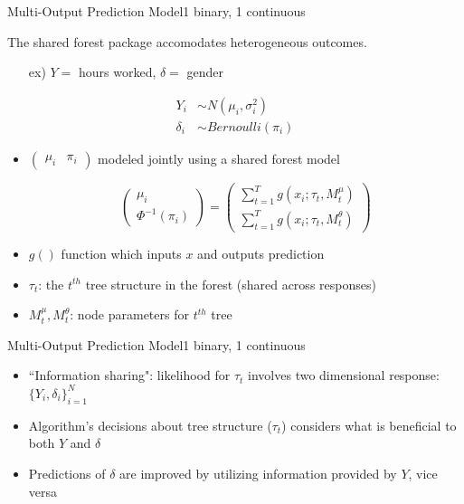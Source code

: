\documentclass{beamer}
\begin{document}
\begin{frame}{Multi-Output Prediction Model}{1 binary, 1 continuous }

The shared forest package accomodates heterogeneous outcomes. 
\begin{itemize}
\item[ex)] $Y = $ hours worked, $\delta = $ gender
\end{itemize}
\begin{align*}
Y_i &\sim N(\mu_i, \sigma^2_i) \\
\delta_i &\sim Bernoulli(\pi_i)
\end{align*}

\begin{itemize}
\item $\begin{pmatrix}\mu_i & \pi_i \end{pmatrix}$ modeled jointly using a shared forest model

$$\begin{pmatrix}\mu_i \\ \Phi^{-1}(\pi_i) \end{pmatrix} = 
\begin{pmatrix}\sum_{t=1}^T g(x_i ; \tau_t, M^{\mu}_t)\\%
\sum_{t=1}^T g(x_i ; \tau_t, M^{\theta}_t)%
\end{pmatrix} $$

\item $g()$ function which inputs $x$ and outputs prediction
\item $\tau_t$: the $t^{th}$ tree structure in the forest (shared across responses)
\item $M^{\mu}_t,M^{\theta}_t$: node parameters for $t^{th}$ tree

\end{itemize}
\end{frame}


\begin{frame}{Multi-Output Prediction Model}{1 binary, 1 continuous }
\begin{itemize}
\item ``Information sharing": likelihood for $\tau_t$ involves two dimensional response: $\{Y_i, \delta_i\}_{i = 1}^N$
\item Algorithm's decisions about tree structure ($\tau_t$) considers what is beneficial to both $Y$ and $\delta$
\item Predictions of $\delta$ are improved by utilizing information provided by $Y$, vice versa
\end{itemize}
\end{frame}
\end{document}
